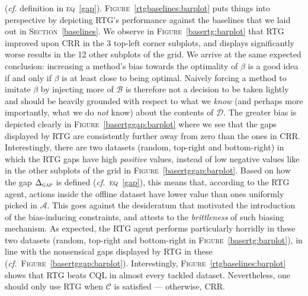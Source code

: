(\textit{cf.} definition in \textsc{eq}~\ref{gap}).
\textsc{Figure}~\ref{rtgbaselines:barplot} puts things into perspective by depicting RTG's performance against the
baselines that we laid out in \textsc{Section}~\ref{baselines}.
We observe in \textsc{Figure}~\ref{basertg:barplot} that RTG improved upon CRR in the
3 top-left corner subplots, and displays significantly worse results in the 12 other subplots of the grid.
We arrive at the same expected conclusion: increasing a method's bias towards the optimality of $\beta$ is
a good idea if and only if $\beta$ is at least close to being optimal.
Naively forcing a method to imitate $\beta$ by injecting more of $\mathcal{B}$ is therefore not a decision to be
taken lightly and should be heavily grounded with respect to what we \emph{know} (and perhaps more importantly,
what we do \emph{not} know) about the contents of $\mathcal{D}$.
The greater bias is depicted clearly in \textsc{Figure}~\ref{basertggap:barplot} where we see that the gaps displayed by
RTG are consistently further away from zero than the ones in CRR.
Interestingly, there are two datasets (random, top-right and bottom-right)
in which the RTG gaps have high \emph{positive}
values, instead of low negative values like in the other subplots of
the grid in \textsc{Figure}~\ref{basertggap:barplot}.
Based on how the gap $\Delta_\textsc{gap}$ is defined (\textit{cf.}~\textsc{eq}~\ref{gap}),
this means that, according to the RTG agent,
actions inside the offline dataset have lower value than ones uniformly picked in $\mathcal{A}$.
This goes against the desideratum that motivated the introduction of the bias-inducing constraints,
and attests to the \emph{brittleness} of such biasing mechanism.
As expected, the RTG agent performs particularly horridly in these two datasets (random, top-right and bottom-right
in \textsc{Figure}~\ref{basertg:barplot}),
in line with the nonsensical gaps displayed by RTG in these (\textit{cf.}~\textsc{Figure}~\ref{basertggap:barplot}).
Interestingly, \textsc{Figure}~\ref{rtgbaselines:barplot} shows that RTG beats CQL
in almost every tackled dataset.
Nevertheless, one should only use RTG when $\mathcal{C}$ is satisfied
--- otherwise, CRR.

